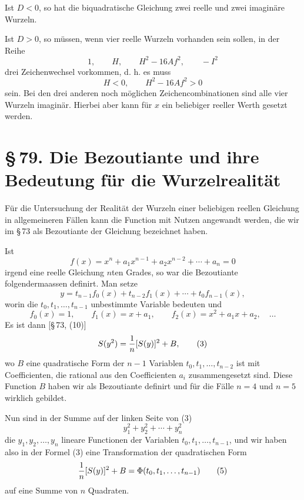 \documentclass[11pt]{article}
\providecommand{\sect}[2]{\section*{\S\,#1. #2}}
\begin{document}
Ist $D<0$, so hat die biquadratische Gleichung zwei reelle und zwei imagin\"are Wurzeln.

Ist $D>0$, so m\"ussen, wenn vier reelle Wurzeln vorhanden sein sollen, in der Reihe
\[
        1,
        \qquad H,
        \qquad H^2-16Af^2,
        \qquad -I^2
\]
drei Zeichenwechsel vorkommen, d. h. es muss
\[
        H<0,
        \qquad
        H^2-16Af^2>0
\]
sein. Bei den drei anderen noch m\"oglichen Zeichencombinationen sind alle vier Wurzeln imagin\"ar. Hierbei aber kann f\"ur $x$ ein beliebiger reeller Werth gesetzt werden.

\sect{79}{Die Bezoutiante und ihre Bedeutung f\"ur die Wurzelrealit\"at}

F\"ur die Untersuchung der Realit\"at der Wurzeln einer beliebigen reellen Gleichung in allgemeineren F\"allen kann die Function mit Nutzen angewandt werden, die wir im \S\,73 als Bezoutiante der Gleichung bezeichnet haben.

Ist
\begin{equation}
        f(x)=x^n+a_1x^{n-1}+a_2x^{n-2}+\cdots+a_n=0
\tag{1}
\end{equation}
irgend eine reelle Gleichung $n$ten Grades, so war die Bezoutiante folgendermaassen definirt. Man setze
\begin{equation}
        y=t_{n-1}f_0(x)+t_{n-2}f_1(x)+\cdots+t_0f_{n-1}(x),
\tag{2}
\end{equation}
worin die $t_0,t_1,\ldots,t_{n-1}$ unbestimmte Variable bedeuten und
\[
 f_0(x)=1,
 \qquad f_1(x)=x+a_1,
 \qquad f_2(x)=x^2+a_1x+a_2,
 \quad\ldots
\]
Es ist dann [\S\,73, (10)]
\begin{equation}
        S(y^2)={1\over n}[S(y)]^2+B,
\tag{3}
\end{equation}
wo $B$ eine quadratische Form der $n-1$ Variablen $t_0,t_1,\ldots,t_{n-2}$ ist mit Coefficienten, die rational aus den Coefficienten $a_i$ zusammengesetzt sind. Diese Function $B$ haben wir als Bezoutiante definirt und f\"ur die F\"alle $n=4$ und $n=5$ wirklich gebildet.

Nun sind in der Summe auf der linken Seite von (3)
\begin{equation}
        y_1^2+y_2^2+\cdots+y_n^2
\tag{4}
\end{equation}
die $y_1,y_2,\ldots,y_n$ lineare Functionen der Variablen $t_0,t_1,\ldots,t_{n-1}$, und wir haben also in der Formel (3) eine Transformation der quadratischen Form
\begin{equation}
        {1\over n}[S(y)]^2+B=\Phi(t_0,t_1,\ldots,t_{n-1})
\tag{5}
\end{equation}
auf eine Summe von $n$ Quadraten.
\end{document}
